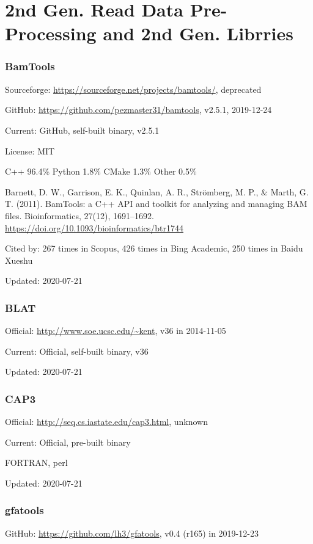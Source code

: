 \documentclass[]{article}
\newcommand{\cb}[3]{\par Cited by: {\color{blue}\Huge #1} times in Scopus, {\color{blue}\Huge #2} times in Bing Academic, {\color{blue}\Huge #3} times in Baidu Xueshu}
\begin{document}
\tableofcontents

\part{2nd Gen. Read Data Pre-Processing and 2nd Gen. Librries}

\section{BamTools}

Sourceforge: \url{https://sourceforge.net/projects/bamtools/}, deprecated

GitHub: \url{https://github.com/pezmaster31/bamtools}, v2.5.1, 2019-12-24

Current: GitHub, self-built binary, v2.5.1

License: MIT

C++ 96.4\% Python 1.8\% CMake 1.3\% Other 0.5\%

Barnett, D. W., Garrison, E. K., Quinlan, A. R., Strömberg, M. P., \& Marth, G. T. (2011). BamTools: a C++ API and toolkit for analyzing and managing BAM files. Bioinformatics, 27(12), 1691–1692. \url{https://doi.org/10.1093/bioinformatics/btr1744}\cb{267}{426}{250}

Updated: 2020-07-21

\section{BLAT}

Official: \url{http://www.soe.ucsc.edu/~kent}, v36 in 2014-11-05

Current: Official, self-built binary, v36

Updated: 2020-07-21

\section{CAP3}

Official: \url{http://seq.cs.iastate.edu/cap3.html}, unknown

Current: Official, pre-built binary

FORTRAN, perl

Updated: 2020-07-21

\section{gfatools}

GitHub: \url{https://github.com/lh3/gfatools}, v0.4 (r165) in 2019-12-23
\end{document}

